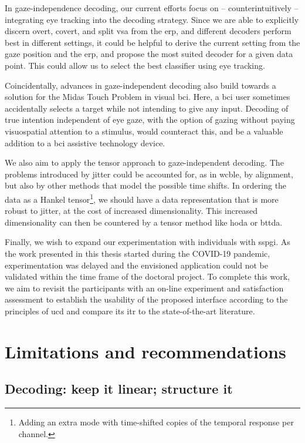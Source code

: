 In gaze-independence decoding, our current efforts focus on --
counterintuitively -- integrating eye tracking into the decoding strategy.
Since we are able to explicitly discern overt, covert, and split \ac{vsa} from
the \ac{erp}, and different decoders perform best in different settings, it
could be helpful to derive the current setting from the gaze position and the
\ac{erp}, and propose the most suited decoder for a given data point.
This could allow us to select the best classifier using eye tracking.

Coincidentally, advances in gaze-independent decoding also build towards a
solution for the Midas Touch Problem in visual \ac{bci}.
Here, a \ac{bci} user sometimes accidentally selects a target while not intending
to give any input.
Decoding of true intention independent of eye
gaze, with the option of gazing without paying visuospatial attention to a
stimulus, would counteract this, and be a valuable addition to a \ac{bci}
assistive technology device.

We also aim to apply the tensor approach to gaze-independent decoding.
The problems introduced by jitter could be accounted for, as in \ac{wcble}, by
alignment, but also by other methods that model the possible time shifts.
In ordering the data as a Hankel tensor\footnote{Adding an extra mode with
time-shifted copies of the temporal response per channel.}, we should have a
data representation that is more robust to jitter, at the cost of increased
dimensionality.
This increased dimensionality can then be countered by a tensor method like
\ac{hoda} or \ac{bttda}.

Finally, we wish to expand our experimentation with individuals with
\ac{sspgi}.
As the work presented in this thesis started during the COVID-19 pandemic,
experimentation was delayed and the envisioned application could not be
validated within the time frame of the doctoral project.
To complete this work, we aim to revisit the participants with an on-line
experiment and satisfaction assessment to establish the usability of the proposed
interface according to the principles of \ac{ucd} and
compare its \ac{itr} to the state-of-the-art literature.

\section{Limitations and recommendations}

\subsection{Decoding: keep it linear; structure it}


